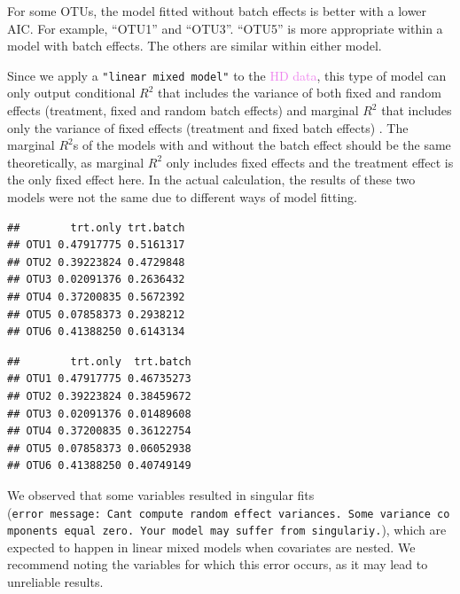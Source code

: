 \documentclass[
]{book}
\newenvironment{Shaded}{\begin{snugshade}}{\end{snugshade}}
\newcommand{\FunctionTok}[1]{\textcolor[rgb]{0.00,0.00,0.00}{#1}}
\newcommand{\NormalTok}[1]{#1}
\newcommand{\SpecialCharTok}[1]{\textcolor[rgb]{0.00,0.00,0.00}{#1}}
\begin{document}
For some OTUs, the model fitted without batch effects is better with a lower AIC. For example, ``OTU1'' and ``OTU3''. ``OTU5'' is more appropriate within a model with batch effects. The others are similar within either model.

Since we apply a \texttt{"linear\ mixed\ model"} to the \textcolor{violet}{HD data}, this type of model can only output conditional \(R^2\) that includes the variance of both fixed and random effects (treatment, fixed and random batch effects) and marginal \(R^2\) that includes only the variance of fixed effects (treatment and fixed batch effects) \citep{nakagawa2013general}. The marginal \(R^2\)s of the models with and without the batch effect should be the same theoretically, as marginal \(R^2\) only includes fixed effects and the treatment effect is the only fixed effect here. In the actual calculation, the results of these two models were not the same due to different ways of model fitting.

\begin{Shaded}
\end{Shaded}

\begin{verbatim}
##        trt.only trt.batch
## OTU1 0.47917775 0.5161317
## OTU2 0.39223824 0.4729848
## OTU3 0.02091376 0.2636432
## OTU4 0.37200835 0.5672392
## OTU5 0.07858373 0.2938212
## OTU6 0.41388250 0.6143134
\end{verbatim}

\begin{Shaded}
\end{Shaded}

\begin{verbatim}
##        trt.only  trt.batch
## OTU1 0.47917775 0.46735273
## OTU2 0.39223824 0.38459672
## OTU3 0.02091376 0.01489608
## OTU4 0.37200835 0.36122754
## OTU5 0.07858373 0.06052938
## OTU6 0.41388250 0.40749149
\end{verbatim}

We observed that some variables resulted in singular fits (\texttt{error\ message:\ Can\textquotesingle{}t\ compute\ random\ effect\ variances.\ Some\ variance\ components\ equal\ zero.\ Your\ model\ may\ suffer\ from\ singulariy.}), which are expected to happen in linear mixed models when covariates are nested. We recommend noting the variables for which this error occurs, as it may lead to unreliable results.
\end{document}
